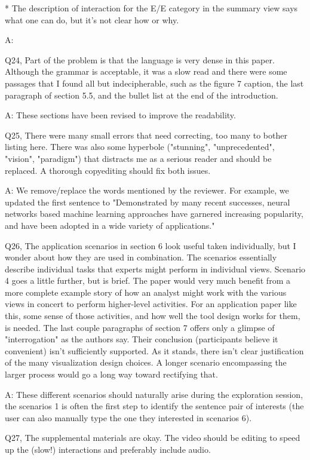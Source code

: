 * The description of interaction for the E/E category in the summary view says what one can do, but it's not clear how or why.

A:

Q24, Part of the problem is that the language is very dense in this paper. Although the grammar is acceptable, it was a slow read and there were some passages that I found all but indecipherable, such as the figure 7 caption, the last paragraph of section 5.5, and the bullet list at the end of the introduction.

A: These sections have been revised to improve the readability.

Q25, There were many small errors that need correcting, too many to bother listing here. There was also some hyperbole ("stunning", "unprecedented", "vision", "paradigm") that distracts me as a serious reader and should be replaced. A thorough copyediting should fix both issues.

A: We remove/replace the words mentioned by the reviewer. For example, we updated the first sentence to "Demonstrated by many recent successes, neural networks based machine learning approaches have garnered increasing popularity, and have been adopted in a wide variety of applications."


Q26, The application scenarios in section 6 look useful taken individually, but I wonder about how they are used in combination. The scenarios essentially describe individual tasks that experts might perform in individual views. Scenario 4 goes a little further, but is brief. The paper would very much benefit from a more complete example story of how an analyst might work with the various views in concert to perform higher-level activities. For an application paper like this, some sense of those activities, and how well the tool design works for them, is needed. The last couple paragraphs of section 7 offers only a glimpse of "interrogation" as the authors say.
Their conclusion (participants believe it convenient) isn't sufficiently supported. As it stands, there isn't clear justification of the many visualization design choices. A longer scenario encompassing the larger process would go a long way toward rectifying that.

A: These different scenarios should naturally arise during the exploration session, the scenarios 1 is often the first step to identify the sentence pair of interests (the user can also manually type the one they interested in scenarios 6).

Q27, The supplemental materials are okay. The video should be editing to speed up the (slow!) interactions and preferably include audio.

